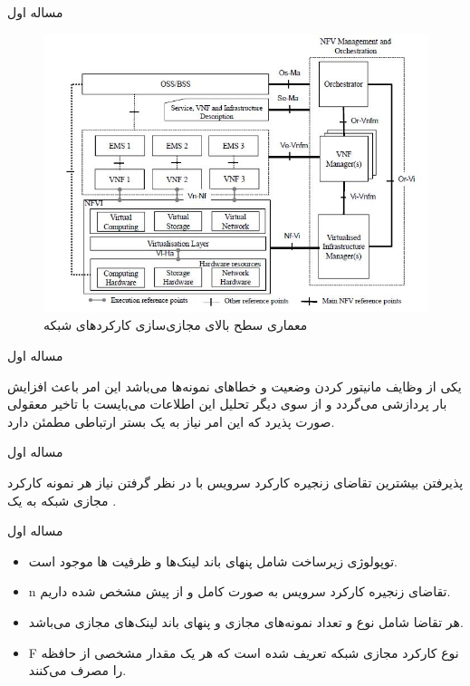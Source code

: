 \documentclass{beamer}
\makeatletter
\newcommand{\RTList}{\raggedleft\rightskip\@totalleftmargin}
\makeatother
\begin{document}
\begin{persian}
\begin{frame}{مساله اول}
	\begin{center}\begin{figure}
		\includegraphics[scale=0.4]{images/nfv-arch.jpg}
		\caption{معماری سطح بالای مجازی‌سازی کارکردهای شبکه}
	\end{figure}\end{center}
\end{frame}
\begin{frame}{مساله اول}
	\par
	یکی از وظایف  مانیتور کردن وضعیت و خطاهای نمونه‌ها می‌باشد
	این امر باعث افزایش بار پردازشی  می‌گردد
	و از سوی دیگر تحلیل این اطلاعات می‌بایست با تاخیر معقولی صورت پذیرد که این امر
	نیاز به یک بستر ارتباطی مطمئن دارد.
\end{frame}
\begin{frame}{مساله اول}
	\par
	پذیرفتن بیشترین تقاضای زنجیره‌ کارکرد سرویس با در نظر گرفتن نیاز هر نمونه کارکرد مجازی شبکه به یک .
\end{frame}
\begin{frame}{مساله اول}
	\begin{itemize}\RTList{}
		\item توپولوژی زیرساخت شامل پنهای باند لینک‌ها و ظرفیت ها موجود است.
		\item n تقاضای زنجیره‌ کارکرد سرویس به صورت کامل و از پیش مشخص شده داریم.
		\item هر تقاضا شامل نوع و تعداد نمونه‌های مجازی و پنهای باند لینک‌های مجازی می‌باشد.
		\item F نوع کارکرد مجازی شبکه تعریف شده است که هر یک مقدار مشخصی از حافظه را مصرف می‌کنند.

\end{itemize}
\end{frame}
\end{persian}
\end{document}
